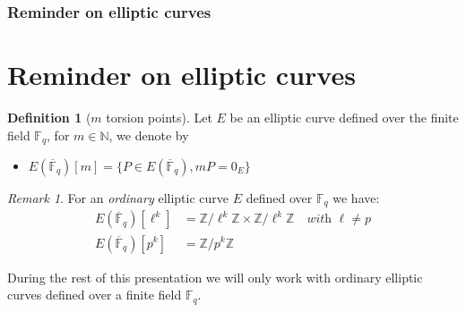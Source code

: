 \documentclass[10pt,a4paper]{beamer}
\theoremstyle{plain}
\theoremstyle{definition}
\theoremstyle{definition}
\theoremstyle{definition}
\theoremstyle{definition}
\newtheorem{defi}[thm]{Definition}
\theoremstyle{remark}
\newtheorem{rem}[thm]{Remark}
\theoremstyle{remark}
\begin{document}
\begin{frame}
\frametitle{Reminder on elliptic curves}
\section{Reminder on elliptic curves}


\begin{defi}[$m$ torsion points]
Let $E$ be an elliptic curve defined over the finite field $\mathbb{F}_q$, for $m \in \mathbb{N}$, we denote by
\begin{itemize}
\item $E(\overline{\mathbb{F}}_q)[m]= \{ P \in E(\overline{\mathbb{F}}_q) , mP=0_E \} $
\end{itemize} 
\end{defi}

\begin{rem}
For an \emph{ordinary} elliptic curve $E$ defined over $\mathbb{F}_q$ we have:
\begin{align*}
E(\overline{\mathbb{F}}_q)[\ell^k]&=\mathbb{Z}/\ell^k\mathbb{Z} \times \mathbb{Z}/\ell^k\mathbb{Z} \quad \textit{with } \ell \neq p \\
E(\overline{\mathbb{F}}_q)[p^k]&=\mathbb{Z}/p^k\mathbb{Z}
\end{align*}
\end{rem}

During the rest of this presentation we will only work with ordinary elliptic curves defined over a finite field $\mathbb{F}_q$.

\end{frame}
\end{document}
